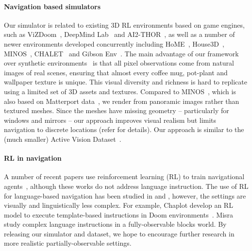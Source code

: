 \documentclass[10pt,twocolumn,letterpaper]{article}
\begin{document}
\paragraph{Navigation based simulators}
Our simulator is related to existing 3D RL environments based on game engines, such as ViZDoom~\cite{Kempka2016ViZDoom}, DeepMind Lab~\cite{beattie2016deepmind} and AI2-THOR~\cite{thor}, as well as a number of newer environments developed concurrently including HoME~\cite{brodeur2017home}, House3D~\cite{house3d}, MINOS~\cite{savva2017minos}, CHALET~\cite{chalet} and Gibson Env~\cite{zamir2018embodied}. The main advantage of our framework over synthetic environments~\cite{thor,brodeur2017home,house3d,chalet} is that all pixel observations come from natural images of real scenes, ensuring that almost every coffee mug, pot-plant and wallpaper texture is unique. This visual diversity and richness is hard to replicate using a limited set of 3D assets and textures. Compared to MINOS~\cite{savva2017minos}, which is also based on Matterport data~\cite{Matterport3D}, we render from panoramic images rather than textured meshes. Since the meshes have missing geometry -- particularly for windows and mirrors -- our approach improves visual realism but limits navigation to discrete locations (refer  for details). Our approach is similar to the (much smaller) Active Vision Dataset~\cite{ammirato2017dataset}.

\vspace{-0.3cm}
\paragraph{RL in navigation}
A number of recent papers use reinforcement learning (RL) to train navigational agents~\cite{kulkarni2016deep,tai2016towards,tessler2017deep,zhu2017icra,gupta2017cognitive}, although these works do not address language instruction. The use of RL for language-based navigation has been studied in \cite{chaplot2017gated} and \cite {misra2017mapping}, however, the settings are visually and linguistically less complex. For example, Chaplot \etal \cite{chaplot2017gated} develop an RL model to execute template-based instructions in Doom environments~\cite{Kempka2016ViZDoom}. Misra \etal \cite {misra2017mapping} study complex language instructions in a fully-observable blocks world. By releasing our simulator and dataset, we hope to encourage further research in more realistic partially-observable settings. 

 
\end{document}
